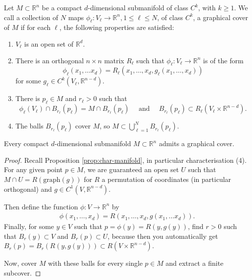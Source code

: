 \begin{definition}\label{def:graph-cov-subm}
	Let $M \subset \mathbb{R}^n$ be a compact $d$-dimensional submanifold of class $C^k$, with $k \geq 1$. We call a collection of $N$ maps $\phi_{\ell}: V_{\ell} \rightarrow \mathbb{R}^n, 1 \leq \ell \leq N$, of class $C^k$, a graphical cover of $M$ if for each $\ell$, the following properties are satisfied:

	\begin{enumerate}
		\item $V_{\ell}$ is an open set of $\mathbb{R}^d$.
		\item There is an orthogonal $n \times n$ matrix $R_{\ell}$ such that $\phi_{\ell}: V_{\ell} \rightarrow \mathbb{R}^n$ is of the form
		      $$
			      \phi_{\ell}\left(x_1, \ldots x_d\right)=R_{\ell}\left(x_1, \ldots, x_d, g_{\ell}\left(x_1, \ldots, x_d\right)\right)
		      $$
		      for some $g_{\ell} \in C^k\left(V_{\ell}, \mathbb{R}^{n-d}\right)$.
		\item There is $p_{\ell} \in M$ and $r_{\ell}>0$ such that
		      $$
			      \phi_{\ell}\left(V_{\ell}\right) \cap B_{r_{\ell}}\left(p_{\ell}\right)=M \cap B_{r_{\ell}}\left(p_{\ell}\right) \quad \text { and } \quad B_{r_{\ell}}\left(p_{\ell}\right) \subset R_{\ell}\left(V_{\ell} \times \mathbb{R}^{n-d}\right) .
		      $$
		\item The balls $B_{r_{\ell}}\left(p_{\ell}\right)$ cover $M$, so $M \subset \bigcup_{\ell=1}^N B_{r_{\ell}}\left(p_{\ell}\right)$.
	\end{enumerate}
\end{definition}

\begin{lemma}\label{lem:graph-cov-subm}
	Every compact $d$-dimensional submanifold $M \subset \mathbb{R}^{n}$ admits a graphical cover.
\end{lemma}
\begin{proof}
	Recall Proposition \ref{prop:char-manifold}, in particular characterisation (4). For any given point $p \in M$, we are guaranteed an open set $U$ such that $M \cap U = R(\text{graph}(g))$ for $R$ a permutation of coordinates (in particular orthogonal) and $g \in C^{1}(V, \mathbb{R}^{n-d})$.

	Then define the function $\phi: V \to \mathbb{R}^{n}$ by
	\begin{align*}
		\phi(x_{1}, \dots, x_{d}) = R(x_{1}, \dots, x_{d}, g(x_{1}, \dots x_{d})).
	\end{align*}
	Finally, for some $y \in V$ such that $p = \phi(y) = R(y, g(y))$, find $r > 0$ such that $B_{r}(y) \subset V$ and $B_{r}(p) \subset U$, because then you automatically get $B_{r}(p) = B_{r}(R(y,g(y))) \subset R(V \times \mathbb{R}^{n-d})$.

	Now, cover $M$ with these balls for every single $p \in M$ and extract a finite subcover.
\end{proof}

